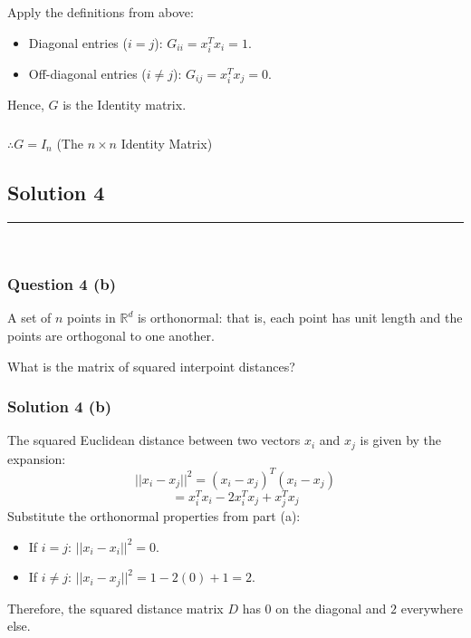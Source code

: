 \documentclass{article}
\begin{document}
Apply the definitions from above:
\begin{itemize}
    \item Diagonal entries ($i=j$): $G_{ii} = x_i^T x_i = 1$.
    \item Off-diagonal entries ($i \neq j$): $G_{ij} = x_i^T x_j = 0$.
\end{itemize}
Hence, $G$ is the Identity matrix.

\subsubsection*{\normalfont}{$\therefore G = I_n$ (The $n \times n$ Identity Matrix)}



\subsection*{Solution 4}
\noindent\rule{\textwidth}{0.4pt}\\
\subsubsection*{Question 4 (b)}
\begin{flushleft}
    A set of $n$ points in $\mathbb{R}^d$ is orthonormal: that is, each point has unit length and the points are orthogonal to one another.

\end{flushleft}
\begin{flushleft}

What is the matrix of squared interpoint distances?
  
\end{flushleft}


\subsubsection*{Solution 4 (b)}
The squared Euclidean distance between two vectors $x_i$ and $x_j$ is given by the expansion:
$$ ||x_i - x_j||^2 = (x_i - x_j)^T (x_i - x_j) $$
$$ = x_i^T x_i - 2x_i^T x_j + x_j^T x_j $$
Substitute the orthonormal properties from part (a):
\begin{itemize}
    \item If $i = j$: $||x_i - x_i||^2 = 0$.
    \item If $i \neq j$: $||x_i - x_j||^2 = 1 - 2(0) + 1 = 2$.
\end{itemize}
Therefore, the squared distance matrix $D$ has $0$ on the diagonal and $2$ everywhere else.
\end{document}
